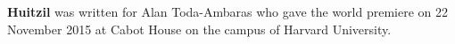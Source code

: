 \textbf{Huitzil} was written for Alan Toda-Ambaras who gave the world premiere
on 22 November 2015 at Cabot House on the campus of Harvard University.
